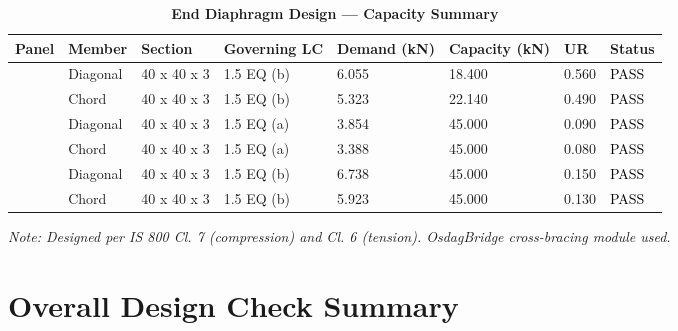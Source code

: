 \documentclass[12pt,a4paper]{report}
\numberwithin{table}{chapter}
\numberwithin{figure}{chapter}
\begin{document}
\vspace{1em}

\begin{longtable}{|C{2.0cm}|L{1.8cm}|C{2.2cm}|C{3.0cm}|C{1.8cm}|C{1.8cm}|C{1.2cm}|C{1.8cm}|}
\caption{\textbf{End Diaphragm Design --- Capacity Summary}}
\hline
\textbf{Panel} & \textbf{Member} & \textbf{Section} & \textbf{Governing LC} & \textbf{Demand (kN)} & \textbf{Capacity (kN)} & \textbf{UR} & \textbf{Status} \\[6pt]
\hline
{} & Diagonal & 40 x 40 x 3 & 1.5 EQ (b) & 6.055 & 18.400 & 0.560 & \textcolor{black}{PASS} \\[6pt]
 & Chord & 40 x 40 x 3 & 1.5 EQ (b) & 5.323 & 22.140 & 0.490 & \textcolor{black}{PASS} \\[6pt]
\hline
{} & Diagonal & 40 x 40 x 3 & 1.5 EQ (a) & 3.854 & 45.000 & 0.090 & \textcolor{black}{PASS} \\[6pt]
 & Chord & 40 x 40 x 3 & 1.5 EQ (a) & 3.388 & 45.000 & 0.080 & \textcolor{black}{PASS} \\[6pt]
\hline
{} & Diagonal & 40 x 40 x 3 & 1.5 EQ (b) & 6.738 & 45.000 & 0.150 & \textcolor{black}{PASS} \\[6pt]
 & Chord & 40 x 40 x 3 & 1.5 EQ (b) & 5.923 & 45.000 & 0.130 & \textcolor{black}{PASS} \\[6pt]
\hline
\end{longtable}
\noindent\textit{Note: Designed per IS 800 Cl. 7 (compression) and Cl. 6 (tension). OsdagBridge cross-bracing module used.}

\section{Overall Design Check Summary}
\label{sec:overall-summary}
\end{document}
